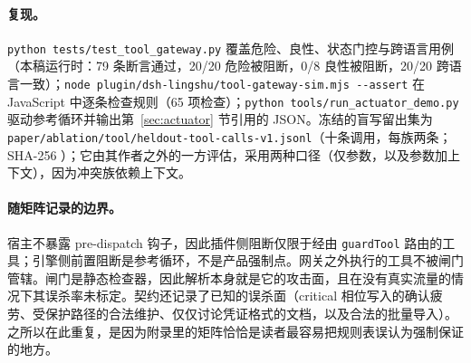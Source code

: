 \paragraph{复现。} \texttt{python tests/\allowbreak{}test\_\allowbreak{}tool\_\allowbreak{}gateway.\allowbreak{}py} 覆盖危险、良性、状态门控与跨语言用例（本稿运行时：79 条断言通过，20/20 危险被阻断，0/8 良性被阻断，20/20 跨语言一致）；\texttt{node plugin/\allowbreak{}dsh-\allowbreak{}lingshu/\allowbreak{}tool-\allowbreak{}gateway-\allowbreak{}sim.\allowbreak{}mjs -\allowbreak{}-\allowbreak{}assert} 在 JavaScript 中逐条检查规则（65 项检查）；\texttt{python tools/\allowbreak{}run\_\allowbreak{}actuator\_\allowbreak{}demo.\allowbreak{}py} 驱动参考循环并输出第~\ref{sec:actuator} 节引用的 JSON。冻结的盲写留出集为 \texttt{paper/\allowbreak{}ablation/\allowbreak{}tool/\allowbreak{}heldout-\allowbreak{}tool-\allowbreak{}calls-\allowbreak{}v1.\allowbreak{}jsonl}（十条调用，每族两条；SHA-256 \texttt{}）；它由其作者之外的一方评估，采用两种口径（仅参数，以及参数加上下文），因为冲突族依赖上下文。

\paragraph{随矩阵记录的边界。} 宿主不暴露 pre-dispatch 钩子，因此插件侧阻断仅限于经由 \texttt{guardTool} 路由的工具；引擎侧前置阻断是参考循环，不是产品强制点。网关之外执行的工具不被闸门管辖。闸门是静态检查器，因此解析本身就是它的攻击面，且在没有真实流量的情况下其误杀率未标定。契约还记录了已知的误杀面（critical 相位写入的确认疲劳、受保护路径的合法维护、仅仅讨论凭证格式的文档，以及合法的批量导入）。之所以在此重复，是因为附录里的矩阵恰恰是读者最容易把规则表误认为强制保证的地方。
